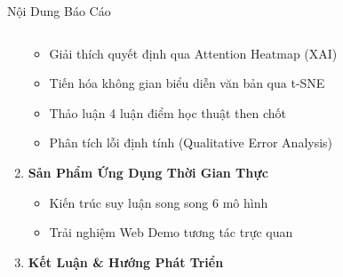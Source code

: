 \documentclass[aspectratio=169, 10pt]{beamer}
\begin{document}
\begin{frame}{Nội Dung Báo Cáo}
\begin{columns}[c]
\begin{column}{0.5\textwidth}
\begin{enumerate}
\begin{itemize}
          \item Giải thích quyết định qua Attention Heatmap (XAI)
          \item Tiến hóa không gian biểu diễn văn bản qua t-SNE
          \item Thảo luận 4 luận điểm học thuật then chốt
          \item Phân tích lỗi định tính (Qualitative Error Analysis)
        \end{itemize}
        \item \textbf{\color{HCMUEDarkBlue}Sản Phẩm Ứng Dụng Thời Gian Thực}
        \begin{itemize}\fontsize{7.5}{9}\selectfont
          \item Kiến trúc suy luận song song 6 mô hình
          \item Trải nghiệm Web Demo tương tác trực quan
        \end{itemize}
        \item \textbf{\color{HCMUEDarkBlue}Kết Luận \& Hướng Phát Triển}
      \end{enumerate}
    \end{column}
  \end{columns}
\end{frame}
\end{document}

